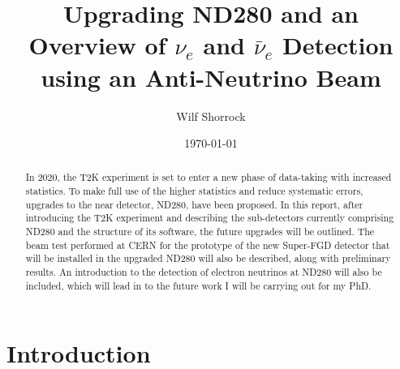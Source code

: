 \documentclass[aps,pra,12pt,notitlepage,tightenlines]{revtex4-1}
\newcommand{\nue}{$\nu_e$ }
\newcommand{\anue}{$\bar\nu_e$ }
\begin{document}
\title{Upgrading ND280 and an Overview of \nue and \anue Detection using an Anti-Neutrino Beam\vspace{0mm}}
\author{Wilf Shorrock\vspace{1mm}}
\date{\today}
\begin{abstract}
\linespread{0.97}
\vspace{1mm} In 2020, the T2K experiment is set to enter a new phase of data-taking with increased statistics. To make full use of the higher statistics and reduce systematic errors, upgrades to the near detector, ND280, have been proposed. In this report, after introducing the T2K experiment and describing the sub-detectors currently comprising ND280 and the structure of its software, the future upgrades will be outlined. The beam test performed at CERN for the prototype of the new Super-FGD detector that will be installed in the upgraded ND280 will also be described, along with preliminary results. An introduction to the detection of electron neutrinos at ND280 will also be included, which will lead in to the future work I will be carrying out for my PhD.
\end{abstract}

\maketitle

\newpage
\tableofcontents
\newpage

\vspace{-8mm}

\section{Introduction}
\end{document}
